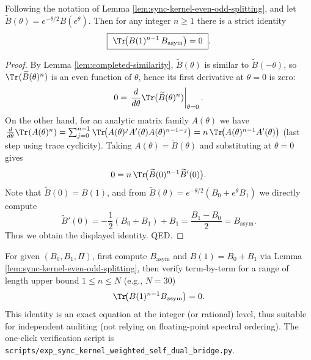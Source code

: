 \begin{lemma}\label{lem:sync-kernel-ward-traces}
Following the notation of Lemma \ref{lem:sync-kernel-even-odd-splitting}, and let
\(
\widetilde B(\theta)=e^{-\theta/2}B(e^{\theta})
\).
Then for any integer \(n\ge 1\) there is a strict identity
\[
\boxed{\ \Tr\!\bigl(B(1)^{n-1}\,B_{\mathrm{asym}}\bigr)=0\ }.
\]
\end{lemma}

\begin{proof}
By Lemma \ref{lem:completed-similarity}, \(\widetilde B(\theta)\) is similar to \(\widetilde B(-\theta)\), so
\(
\Tr(\widetilde B(\theta)^n)
\)
is an even function of \(\theta\), hence its first derivative at \(\theta=0\) is zero:
\[
0=\left.\frac{d}{d\theta}\Tr(\widetilde B(\theta)^n)\right|_{\theta=0}.
\]
On the other hand, for an analytic matrix family \(A(\theta)\) we have
\(
\frac{d}{d\theta}\Tr(A(\theta)^n)
=\sum_{j=0}^{n-1}\Tr\!\bigl(A(\theta)^j A'(\theta)A(\theta)^{n-1-j}\bigr)
=n\,\Tr\!\bigl(A(\theta)^{n-1}A'(\theta)\bigr)
\)
(last step using trace cyclicity).
Taking \(A(\theta)=\widetilde B(\theta)\) and substituting at \(\theta=0\) gives
\[
0=n\,\Tr\!\bigl(\widetilde B(0)^{n-1}\widetilde B'(0)\bigr).
\]
Note that \(\widetilde B(0)=B(1)\), and from
\(
\widetilde B(\theta)=e^{-\theta/2}(B_0+e^\theta B_1)
\)
we directly compute
\[
\widetilde B'(0)=-\frac12(B_0+B_1)+B_1=\frac{B_1-B_0}{2}=B_{\mathrm{asym}}.
\]
Thus we obtain the displayed identity. QED.
\end{proof}

\begin{remark}\label{rem:sync-kernel-ward-traces-bridge}
For given \((B_0,B_1,\Pi)\), first compute \(B_{\mathrm{asym}}\) and \(B(1)=B_0+B_1\) via Lemma \ref{lem:sync-kernel-even-odd-splitting}, then verify term-by-term for a range of length upper bound \(1\le n\le N\) (e.g., \(N=30\))
\[
\Tr\!\bigl(B(1)^{n-1}B_{\mathrm{asym}}\bigr)=0.
\]
This identity is an exact equation at the integer (or rational) level, thus suitable for independent auditing (not relying on floating-point spectral ordering). The one-click verification script is \texttt{scripts/exp\_sync\_kernel\_weighted\_self\_dual\_bridge.py}.
\end{remark}

